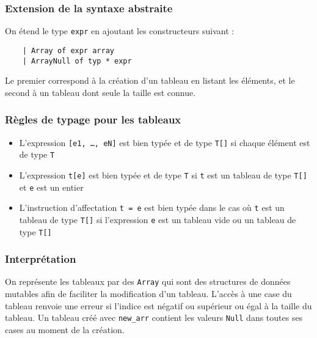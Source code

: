 \documentclass{article}
\begin{document}
\subsubsection{Extension de la syntaxe abstraite}
On étend le type \texttt{expr} en ajoutant les constructeurs suivant : 
\begin{verbatim}
    | Array of expr array
    | ArrayNull of typ * expr
\end{verbatim}

Le premier correspond à la création d'un tableau en listant les éléments, et le second 
à un tableau dont seule la taille est connue.

\subsubsection{Règles de typage pour les tableaux} 
\begin{itemize}
    \item L'expression \texttt{[e1, \dots, eN]} est bien typée et de type \texttt{T[]} si chaque élément est de type \texttt{T}
    \item L'expression \texttt{t[e]} est bien typée et de type \texttt{T} si \texttt{t} est un tableau de type \texttt{T[]} et \texttt{e} est un entier
    \item L'instruction d'affectation \texttt{t = e} est bien typée dans le cas où \texttt{t} est un tableau de type \texttt{T[]} si l'expression \texttt{e} est un tableau vide ou un tableau de type \texttt{T[]}
\end{itemize}

\subsubsection{Interprétation}
On représente les tableaux par des \texttt{Array} qui sont des structures de données mutables afin de faciliter la modification d'un tableau.
L'accès à une case du tableau renvoie une erreur si l'indice est négatif ou supérieur ou égal à la taille du tableau.
Un tableau créé avec \texttt{new\_arr} contient les valeurs \texttt{Null} dans toutes ses cases au moment de la création.
\end{document}
